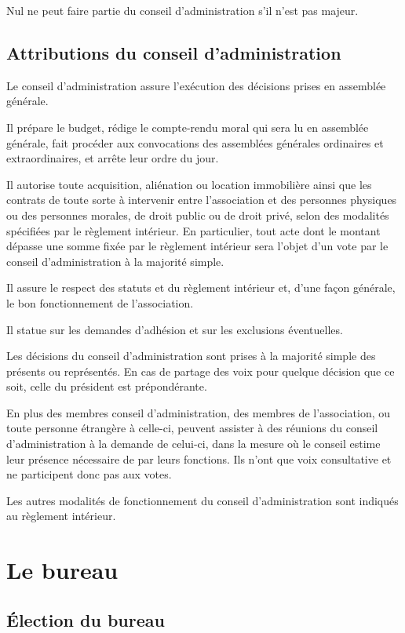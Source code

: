 \documentclass[a4wide,12pt]{scrartcl}
\begin{document}
Nul ne peut faire partie du conseil d'administration s'il n'est pas
majeur.

\subsection{Attributions du conseil d'administration}

Le conseil d'administration assure l'exécution des décisions prises en
assemblée générale.

Il prépare le budget, rédige le compte-rendu moral qui sera lu en
assemblée générale, fait procéder aux convocations des assemblées
générales ordinaires et extraordinaires, et arrête leur ordre du jour.

Il autorise toute acquisition, aliénation ou location immobilière
ainsi que les contrats de toute sorte à intervenir entre l'association
et des personnes physiques ou des personnes morales, de droit public
ou de droit privé, selon des modalités spécifiées par le règlement
intérieur. En particulier, tout acte dont le montant dépasse une somme
fixée par le règlement intérieur sera l'objet d'un vote par le conseil
d'administration à la majorité simple.

Il assure le respect des statuts et du règlement intérieur et, d'une
façon générale, le bon fonctionnement de l'association.

Il statue sur les demandes d'adhésion et sur les exclusions
éventuelles.

Les décisions du conseil d'administration sont prises à la majorité
simple des présents ou représentés. En cas de partage des voix pour
quelque décision que ce soit, celle du président est prépondérante.

En plus des membres conseil d'administration, des membres de
l'association, ou toute personne étrangère à celle-ci, peuvent
assister à des réunions du conseil d'administration à la demande de
celui-ci, dans la mesure où le conseil estime leur présence nécessaire
de par leurs fonctions. Ils n'ont que voix consultative et ne
participent donc pas aux votes.

Les autres modalités de fonctionnement du conseil d'administration
sont indiqués au règlement intérieur.

\section{Le bureau}

\subsection{Élection du bureau}
\end{document}
